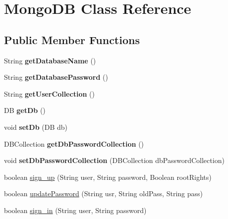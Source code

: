 \hypertarget{class_mongo_d_b}{}\section{Mongo\+DB Class Reference}
\label{class_mongo_d_b}
\subsection*{Public Member Functions}
\begin{DoxyCompactItemize}
\item 
\mbox{\label{class_mongo_d_b_a5e60a5605d070637ce60a3dc4e67138a}} 
String {\bfseries get\+Database\+Name} ()
\item 
\mbox{\label{class_mongo_d_b_a86a8fe83d594dc26f709b9e048c79fe6}} 
String {\bfseries get\+Database\+Password} ()
\item 
\mbox{\label{class_mongo_d_b_adf1dfa43d61be69c1673bb8ddfeb210e}} 
String {\bfseries get\+User\+Collection} ()
\item 
\mbox{\label{class_mongo_d_b_a70007164c403cb52ac8e87b0137aa27e}} 
DB {\bfseries get\+Db} ()
\item 
\mbox{\label{class_mongo_d_b_afa9b1ff69f975af22fdff7860c600c8e}} 
void {\bfseries set\+Db} (DB db)
\item 
\mbox{\label{class_mongo_d_b_aa46409219a8b26d1b0a229e464be7258}} 
D\+B\+Collection {\bfseries get\+Db\+Password\+Collection} ()
\item 
\mbox{\label{class_mongo_d_b_a54e2ada48adc6b47a40d5092113b2369}} 
void {\bfseries set\+Db\+Password\+Collection} (D\+B\+Collection db\+Password\+Collection)
\item 
boolean \hyperlink{class_mongo_d_b_a9c69be7c091bffc9d1950e118fdb2251}{sign\+\_\+up} (String user, String password, Boolean root\+Rights)
\item 
boolean \hyperlink{class_mongo_d_b_a3dcc0c59c2074af772c4dc23411b7d6a}{update\+Password} (String usr, String old\+Pass, String pass)
\item 
boolean \hyperlink{class_mongo_d_b_a672df0039a1fcd302bd399089bb7fe28}{sign\+\_\+in} (String user, String password)

\end{DoxyCompactItemize}
